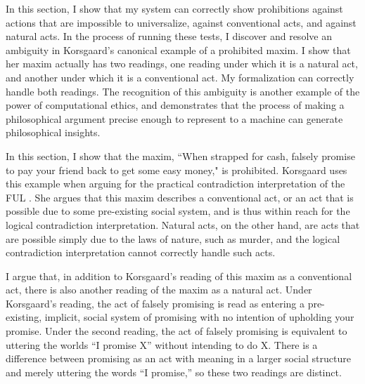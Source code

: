 %
\begin{isabellebody}%
%
%
\isadelimtheory
%
\endisadelimtheory
%
\isatagtheory
%
\endisatagtheory
{\isafoldtheory}%
%
\isadelimtheory
%
\endisadelimtheory
%
\isadelimdocument
%
\endisadelimdocument
%
\isatagdocument
%
\isamarkuptrue%
%
\endisatagdocument
{\isafolddocument}%
%
\isadelimdocument
%
\endisadelimdocument
%
\begin{isamarkuptext}%
In this section, I show that my system can correctly show prohibitions against actions that 
are impossible to universalize, against conventional acts, and against natural acts. In the process
of running these tests, I discover and resolve an ambiguity in Korsgaard's canonical example of a 
prohibited maxim. I show that her maxim actually has two readings, one reading under which it is a 
natural act, and another under which it is a conventional act. My formalization can correctly
handle both readings. The recognition of this ambiguity is another example of the power of 
computational ethics, and demonstrates that the process of making a philosophical argument precise 
enough to represent to a machine can generate philosophical insights.

In this section, I show that the maxim, ``When strapped for cash, falsely promise to pay your friend back
to get some easy money," is prohibited. Korsgaard uses this example when arguing for the practical
contradiction interpretation of the FUL \citep{KorsgaardFUL}. She argues that this maxim describes
a conventional act, or an act that is possible due to some pre-existing social system, and is thus
within reach for the logical contradiction interpretation. Natural acts, on the other hand, are acts
that are possible simply due to the laws of nature, such as murder, and the logical contradiction
interpretation cannot correctly handle such acts. 

I argue that, in addition to Korsgaard's reading of this maxim as a conventional act, there is also
another reading of the maxim as a natural act. 
Under Korsgaard's reading, the act of falsely promising is read as
entering a pre-existing, implicit, social system of promising with no intention of upholding your 
promise. Under the second reading, the act of falsely promising is equivalent to uttering the worlds 
``I promise X'' without intending to do X. There is a difference
between promising as an act with meaning in a larger social structure and merely uttering the words
``I promise,'' so these two readings are distinct.


\end{isamarkuptext}
\end{isabellebody}
